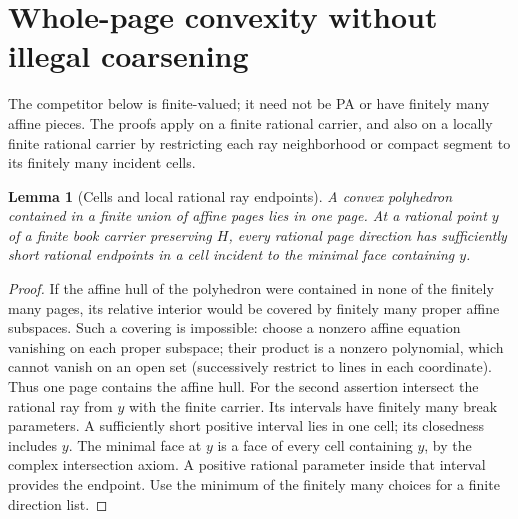 \documentclass[11pt]{article}
\newtheorem{lemma}[theorem]{Lemma}
\theoremstyle{definition}\newtheorem{definition}[theorem]{Definition}
\theoremstyle{remark}\newtheorem{remark}[theorem]{Remark}
\begin{document}
\section{Whole-page convexity without illegal coarsening}\label{s:page}
The competitor below is finite-valued; it need not be PA or have finitely many affine pieces. The proofs apply on a finite rational carrier, and also on a locally finite rational carrier by restricting each ray neighborhood or compact segment to its finitely many incident cells.
\begin{lemma}[Cells and local rational ray endpoints]\label{l:pagecells}
A convex polyhedron contained in a finite union of affine pages lies in one page. At a rational point $y$ of a finite book carrier preserving $H$, every rational page direction has sufficiently short rational endpoints in a cell incident to the minimal face containing $y$.
\end{lemma}
\begin{proof}
If the affine hull of the polyhedron were contained in none of the finitely many pages, its relative interior would be covered by finitely many proper affine subspaces. Such a covering is impossible: choose a nonzero affine equation vanishing on each proper subspace; their product is a nonzero polynomial, which cannot vanish on an open set (successively restrict to lines in each coordinate). Thus one page contains the affine hull. For the second assertion intersect the rational ray from $y$ with the finite carrier. Its intervals have finitely many break parameters. A sufficiently short positive interval lies in one cell; its closedness includes $y$. The minimal face at $y$ is a face of every cell containing $y$, by the complex intersection axiom. A positive rational parameter inside that interval provides the endpoint. Use the minimum of the finitely many choices for a finite direction list.
\end{proof}
\end{document}
